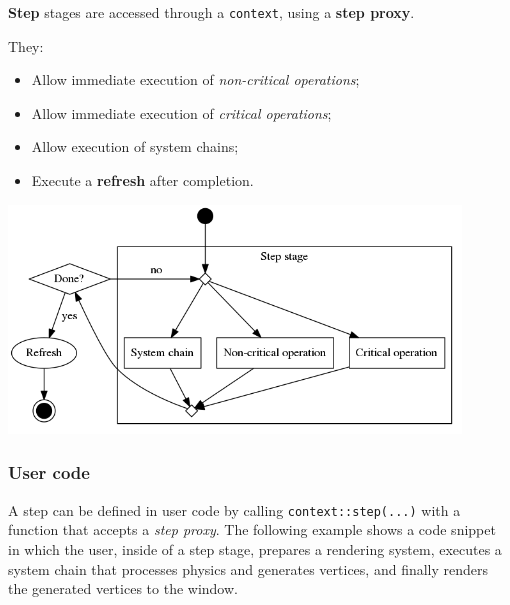 \documentclass[twoside, 12pt, a4paper, openany]{book}
\let\origfigure=\figure
\let\endorigfigure=\endfigure
\renewenvironment{figure}[1][]{%
\origfigure[H]
}{%
\endorigfigure
}
\begin{document}
\textbf{Step} stages are accessed through a
\texttt{context},
using a \textbf{step proxy}.

They:

\begin{itemize}
\item
  Allow immediate execution of \emph{non-critical operations};
\item
  Allow immediate execution of \emph{critical operations};
\item
  Allow execution of system chains;
\item
  Execute a \textbf{refresh} after completion.
\end{itemize}

\begin{figure}[htbp]
\centering
\includegraphics[width=0.90000\textwidth]{source/figures/generated/ecst/flow/stepact.png}
\caption{ECST flow: ``step'' stage overview}
\end{figure}

\subsubsection{User code}\label{user-code}

A step can be defined in user code by calling
\texttt{context::step(...)}
with a function that accepts a \emph{step proxy}. The following example
shows a code snippet in which the user, inside of a step stage, prepares
a rendering system, executes a system chain that processes physics and
generates vertices, and finally renders the generated vertices to the
window.
\end{document}

